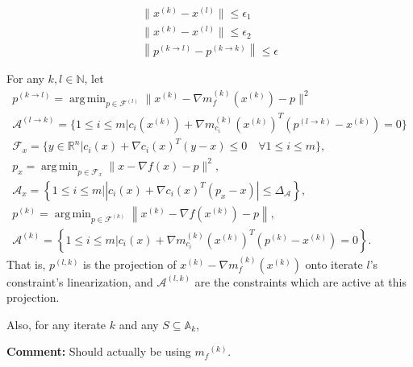 \documentclass{article}
\newenvironment{comment}
  {\par\medskip
   \color{red}%
   \begin{framed}
   \textbf{Comment: }\ignorespaces}
 {\end{framed}
  \medskip}
\theoremstyle{case}
\numberwithin{theorem}{subsection}
\DeclareMathOperator*{\argmin}{arg\,min}
\newcommand{\abuf}{{\alpha_{\text{buffer}}}}
\newcommand{\activeconstraintsk}{{\mathbb A_{k}}}
\newcommand{\atr}{{A_{\textrm{TR}}}}
\newcommand{\atrk}{{A^{(k)}_{\textrm{TR}}}}
\newcommand{\btr}{{b_{\text{TR}}}}
\newcommand{\btrk}{{b^{(k)}_{\textrm{TR}}}}
\newcommand{\domain}{{\mathcal X}}
\newcommand{\feasiblek}{{\mathcal F^{(k)}}}
\newcommand{\gk}{{\nabla m_f^{(k)}\left(x^{(k)}\right)}}
\newcommand{\gmcik}{{\nabla m_{c_i}^{(k)}\left(\xk\right)}}
\newcommand{\gradf}{\nabla f}
\newcommand{\mfk}{{{m}_f}^{(k)}}
\newcommand{\minactivegraddelta}{{\Delta_{\mathcal A}}}
\newcommand{\naturals}{\mathbb N}
\newcommand{\oalpha}{\tau_{\Delta}}
\newcommand{\polydn}{\mathcal{P}^d_n}
\newcommand{\reg}{{\delta_{\textrm{reg}}}}
\newcommand{\Rn}{\mathbb R^n}
\newcommand{\trsinfset}{{E_\textrm{infeasible}}}
\newcommand{\trstol}{{\delta_\textrm{infeasible}}}
\newcommand{\ximin}{\xi_{\text{min}}}
\newcommand{\xk}{{x^{(k)}}}
\begin{document}
\begin{align*}
\|\xk - x^{(l)}\| \le \epsilon_1 \\
\|\xk - x^{(l)}\| \le \epsilon_2 \\
\left\|p^{(k\to l)} - p^{(k\to k)}\right\| \le \epsilon
\end{align*}


For any $k, l \in \naturals$, let 
\begin{align}
p^{(k \to l)} = \argmin_{p \in \mathcal F^{(l)}} \|\xk - \gk - p\|^2 \label{bp2_define_plk} \\
\mathcal A^{(l \to k)} = \{1 \le i \le m | c_i(\xk) + \gmcik^T(p^{(l\to k)} - \xk) = 0 \} \label{bp_define_activep_not_used} \\
\mathcal F_x = \{ y \in \Rn | c_i(x) + \nabla c_i(x)^T(y - x) \le 0 \quad \forall 1 \le i \le m\}, \label{bp_define_true_linearization_not_used} \\
p_x = \argmin_{p \in \mathcal F_x} \|x - \gradf(x) - p\|^2, \label{bp_define_true_projection_not_used} \\
\mathcal A_x = \left\{1 \le i \le m | \left|c_i(x) + \nabla c_i(x)^T(p_x - x)\right| \le \minactivegraddelta \right\}, \label{define_projection_active_not_used} \\
p^{(k)} = \argmin_{p \in \feasiblek} \left\| \xk - \nabla f\left(\xk\right) - p \right\|, \label{bp_define_pl_not_used} \\
\mathcal A^{(k)} = \left\{1 \le i \le m | c_i(x) + \gmcik^T\left(p^{(k)} - \xk\right) = 0 \right\}. \label{bp_define_yet_another_thing_not_used}
\end{align}
That is, $p^{(l, k)}$ is the projection of $\xk - \gk$ onto iterate $l$'s constraint's linearization,
and $\mathcal A^{(l, k)}$ are the constraints which are active at this projection.

Also, for any iterate $k$ and any $S \subseteq \activeconstraintsk$,






\appendix


\begin{comment}
Should actually be using $\mfk$.
\end{comment}

\end{document}
